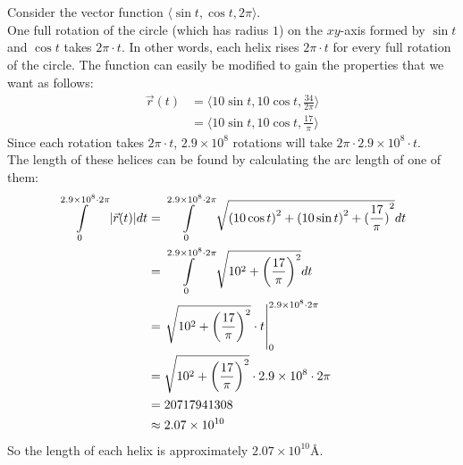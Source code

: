 \documentclass{article}
\begin{document}
\section{}
	Consider the vector function $\langle\sin{t},\cos{t},2\pi\rangle$.\\
	One full rotation of the circle (which has radius $1$) on the $xy$-axis formed by $\sin{t}$ and $\cos{t}$ takes $2\pi\cdot{t}$. In
	other words, each helix rises $2\pi\cdot{t}$ for every full rotation of the circle. The function can easily be modified to gain the
	properties that we want as follows:
	\begin{align*}
		\vec{r}(t)&=\bigg\langle10\sin{t},10\cos{t},\frac{34}{2\pi}\bigg\rangle\\
		&=\bigg\langle10\sin{t},10\cos{t},\frac{17}{\pi}\bigg\rangle
	\end{align*}
	Since each rotation takes $2\pi\cdot{t}$, $2.9\times10^8$ rotations will take $2\pi\cdot2.9\times10^8\cdot{t}$.\\
	The length of these helices can be found by calculating the arc length of one of them:
	\begin{align*}
		\int\displaylimits_{0}^{2.9\times10^8\cdot2\pi}|\vec{r}(t)|dt&=\int\displaylimits_{0}^{2.9\times10^8\cdot2\pi}\sqrt{{(10\cos{t})}^2+{(10\sin{t})}^2+{(\frac{17}{\pi})}^2}dt\\
		&=\int\displaylimits_{0}^{2.9\times10^8\cdot2\pi}\sqrt{10^2+{\bigg(\frac{17}{\pi}\bigg)}^2}dt\\
		&=\left. \sqrt{10^2+{\bigg(\frac{17}{\pi}\bigg)}^2}\cdot{t}\right\rvert_{0}^{2.9\times10^8\cdot2\pi}\\
		&=\sqrt{10^2+{\bigg(\frac{17}{\pi}\bigg)}^2}\cdot{2.9\times10^8\cdot2\pi}\\
		&=20717941308\\
		&\approx2.07\times10^{10}
	\end{align*}
	So the length of each helix is approximately $2.07\times10^{10}$\AA.\@
\end{document}
